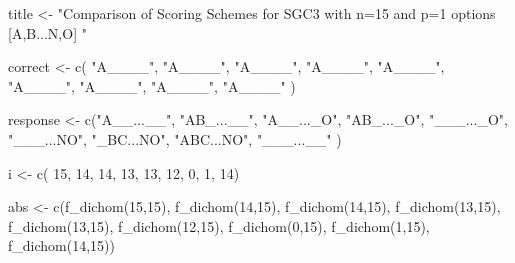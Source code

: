 \documentclass[
  letterpaper,
  DIV=11,
  numbers=noendperiod]{scrreprt}
\newenvironment{Shaded}{\begin{snugshade}}{\end{snugshade}}
\newcommand{\DecValTok}[1]{\textcolor[rgb]{0.68,0.00,0.00}{#1}}
\newcommand{\FunctionTok}[1]{\textcolor[rgb]{0.28,0.35,0.67}{#1}}
\newcommand{\NormalTok}[1]{\textcolor[rgb]{0.00,0.23,0.31}{#1}}
\newcommand{\OtherTok}[1]{\textcolor[rgb]{0.00,0.23,0.31}{#1}}
\newcommand{\StringTok}[1]{\textcolor[rgb]{0.13,0.47,0.30}{#1}}
\begin{document}
\begin{Shaded}
\begin{Highlighting}[]
\NormalTok{title }\OtherTok{\textless{}{-}} \StringTok{"Comparison of Scoring Schemes for SGC3 with n=15 and p=1 options [A,B...N,O]  "}

\NormalTok{correct }\OtherTok{\textless{}{-}} \FunctionTok{c}\NormalTok{( }\StringTok{"A\_\_\_\_"}\NormalTok{,  }
              \StringTok{"A\_\_\_\_"}\NormalTok{,      }
              \StringTok{"A\_\_\_\_"}\NormalTok{,      }
              \StringTok{"A\_\_\_\_"}\NormalTok{,        }
              \StringTok{"A\_\_\_\_"}\NormalTok{,      }
              \StringTok{"A\_\_\_\_"}\NormalTok{,      }
              \StringTok{"A\_\_\_\_"}\NormalTok{,      }
              \StringTok{"A\_\_\_\_"}\NormalTok{,      }
              \StringTok{"A\_\_\_\_"}\NormalTok{ ) }

\NormalTok{response }\OtherTok{\textless{}{-}} \FunctionTok{c}\NormalTok{(}\StringTok{"A\_\_...\_\_"}\NormalTok{,  }
              \StringTok{"AB\_...\_\_"}\NormalTok{,      }
              \StringTok{"A\_\_...\_O"}\NormalTok{,      }
              \StringTok{"AB\_...\_O"}\NormalTok{,        }
              \StringTok{"\_\_\_...\_O"}\NormalTok{,      }
              \StringTok{"\_\_\_...NO"}\NormalTok{,      }
              \StringTok{"\_BC...NO"}\NormalTok{,}
              \StringTok{"ABC...NO"}\NormalTok{,      }
              \StringTok{"\_\_\_...\_\_"}\NormalTok{ )}

\NormalTok{i }\OtherTok{\textless{}{-}} \FunctionTok{c}\NormalTok{(        }\DecValTok{15}\NormalTok{,       }
               \DecValTok{14}\NormalTok{,              }
               \DecValTok{14}\NormalTok{,              }
               \DecValTok{13}\NormalTok{,}
               \DecValTok{13}\NormalTok{,               }
               \DecValTok{12}\NormalTok{,          }
               \DecValTok{0}\NormalTok{,}
               \DecValTok{1}\NormalTok{,}
               \DecValTok{14}\NormalTok{)}

\NormalTok{abs }\OtherTok{\textless{}{-}} \FunctionTok{c}\NormalTok{(}\FunctionTok{f\_dichom}\NormalTok{(}\DecValTok{15}\NormalTok{,}\DecValTok{15}\NormalTok{), }
         \FunctionTok{f\_dichom}\NormalTok{(}\DecValTok{14}\NormalTok{,}\DecValTok{15}\NormalTok{), }
         \FunctionTok{f\_dichom}\NormalTok{(}\DecValTok{14}\NormalTok{,}\DecValTok{15}\NormalTok{), }
         \FunctionTok{f\_dichom}\NormalTok{(}\DecValTok{13}\NormalTok{,}\DecValTok{15}\NormalTok{), }
         \FunctionTok{f\_dichom}\NormalTok{(}\DecValTok{13}\NormalTok{,}\DecValTok{15}\NormalTok{),}
         \FunctionTok{f\_dichom}\NormalTok{(}\DecValTok{12}\NormalTok{,}\DecValTok{15}\NormalTok{),}
         \FunctionTok{f\_dichom}\NormalTok{(}\DecValTok{0}\NormalTok{,}\DecValTok{15}\NormalTok{),}
         \FunctionTok{f\_dichom}\NormalTok{(}\DecValTok{1}\NormalTok{,}\DecValTok{15}\NormalTok{),}
         \FunctionTok{f\_dichom}\NormalTok{(}\DecValTok{14}\NormalTok{,}\DecValTok{15}\NormalTok{))}


\end{Highlighting}
\end{Shaded}
\end{document}
